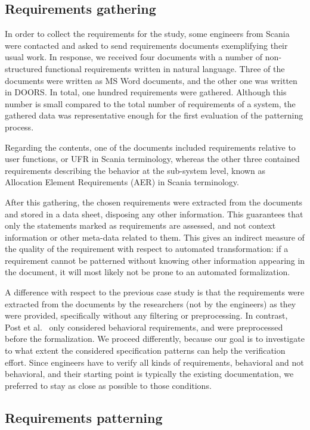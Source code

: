 \documentclass[conference]{IEEEtran}
\begin{document}
\subsection{Requirements gathering}

In order to collect the requirements for the study, some engineers from Scania were contacted and asked to send requirements documents exemplifying their usual work. In response, we received four documents with a number of non-structured functional requirements written in natural language. Three of the documents were written as MS Word documents, and the other one was written in DOORS.
In total, one hundred requirements were gathered. Although this number is small compared to the total number of requirements of a system, the gathered data was representative enough for the first evaluation of the patterning process.

Regarding the contents, one of the documents included requirements relative to user functions, or UFR in Scania terminology, whereas the other three contained requirements describing the behavior at the sub-system level, known as Allocation Element Requirements (AER) in Scania terminology.

After this gathering, the chosen requirements were extracted from the documents and stored in a data sheet, disposing any other information. This guarantees that only the statements marked as requirements are assessed, and not context information or other meta-data related to them. This gives an indirect measure of the quality of the requirement with respect to automated transformation: if a requirement cannot be patterned without knowing other information appearing in the document, it will most likely not be prone to an automated formalization.

A difference with respect to the previous case study is that the requirements were extracted from the documents by the researchers (not by the engineers) as they were provided, specifically without any filtering or preprocessing. In contrast, Post et al.~\cite{Post12bosch} only considered behavioral requirements, and were preprocessed before the formalization. We proceed differently, because our goal is to investigate to what extent the considered specification patterns can help the verification effort. Since engineers have to verify all kinds of requirements, behavioral and not behavioral, and their starting point is typically the existing documentation, we preferred to stay as close as possible to those conditions.

\subsection{Requirements patterning}
\end{document}
